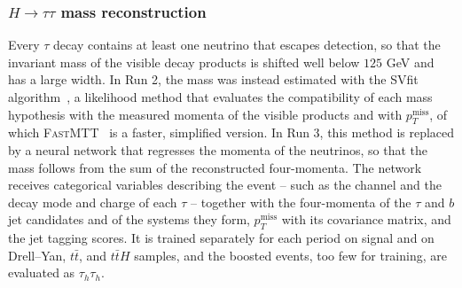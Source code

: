 \subsubsection{\texorpdfstring{$H\to\tau\tau$}{H->tautau} mass reconstruction}
%
Every $\tau$ decay contains at least one neutrino that escapes detection, so that the invariant mass of the visible decay products is shifted well below $125$ GeV and has a large width. In Run 2, the mass was instead estimated with the SVfit algorithm~\cite{fastmtt}, a likelihood method that evaluates the compatibility of each mass hypothesis with the measured momenta of the visible products and with $p_T^\text{miss}$, of which \textsc{FastMTT}~\cite{Kalinowski:2025vci} is a faster, simplified version. In Run 3, this method is replaced by a neural network that regresses the momenta of the neutrinos, so that the mass follows from the sum of the reconstructed four-momenta. The network receives categorical variables describing the event -- such as the channel and the decay mode and charge of each $\tau$ -- together with the four-momenta of the $\tau$ and $b$ jet candidates and of the systems they form, $p_T^\text{miss}$ with its covariance matrix, and the jet tagging scores. It is trained separately for each period on signal and on Drell--Yan, $t\bar{t}$, and $t\bar{t}H$ samples, and the boosted events, too few for training, are evaluated as $\tau_h\tau_h$.

